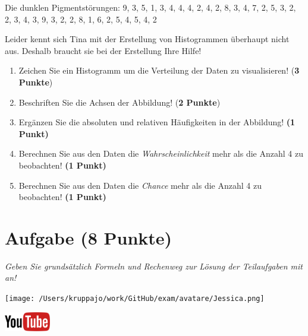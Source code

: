 \documentclass[a4paper, 9pt]{scrartcl}\usepackage[]{graphicx}\usepackage[]{xcolor}
\begin{document}
\begin{center}
Die dunklen Pigmentstörungen: 9, 3, 5, 1, 3, 4, 4, 4, 2, 4, 2, 8, 3, 4, 7, 2, 5, 3, 2, 2, 3, 4, 3, 9, 3, 2, 2, 8, 1, 6, 2, 5, 4, 5, 4, 2
\end{center}

Leider kennt sich Tina mit der Erstellung von Histogrammen überhaupt nicht aus. Deshalb braucht sie bei der Erstellung Ihre Hilfe!

\begin{enumerate}
\item Zeichen Sie ein Histogramm um die Verteilung der Daten zu visualisieren! (\textbf{3 Punkte})
\item Beschriften Sie die Achsen der Abbildung! (\textbf{2 Punkte})
\item Ergänzen Sie die absoluten und relativen Häufigkeiten in der
  Abbildung! \textbf{(1 Punkt)}
\item Berechnen Sie aus den Daten die \textit{Wahrscheinlichkeit}
  mehr als die Anzahl 4 zu beobachten! \textbf{(1
    Punkt)}
\item Berechnen Sie aus den Daten die \textit{Chance} mehr
  als die Anzahl 4 zu beobachten! \textbf{(1 Punkt)}
\end{enumerate}

 
\clearpage

\section{Aufgabe \hfill (8 Punkte)}

\textit{Geben Sie grundsätzlich Formeln und Rechenweg zur Lösung der Teilaufgaben mit an!} \\[1Ex]
 

 
\begin{minipage}[t]{0.5\textwidth}
\texttt{[image: /Users/kruppajo/work/GitHub/exam/avatare/Jessica.png]}
\end{minipage}
\begin{minipage}[t]{0.5\textwidth}
\hfill
\href{https://youtu.be/ORHSPTCdfeY}{\includegraphics[width = 2cm]{img/youtube}}\\[1Ex]
\end{minipage}
\vspace{1ex}
\end{document}

